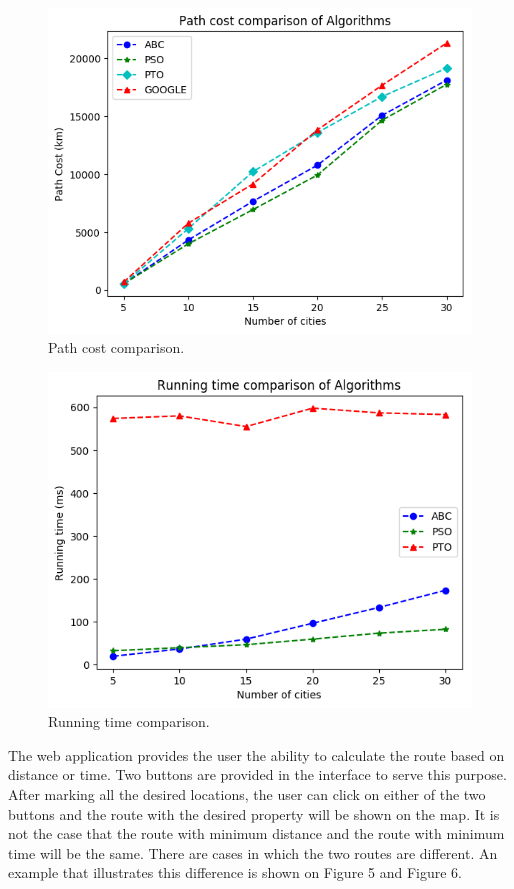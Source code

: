 \documentclass[conference]{IEEEtran}
\begin{document}
\begin{figure}[htbp]
\centerline{\includegraphics[width=\columnwidth]{pathcost.png}}
\caption{Path cost comparison.}
\label{fig1}
\end{figure}

\begin{figure}[htbp]
\centerline{\includegraphics[width=\columnwidth]{runtime.png}}
\caption{Running time comparison.}
\label{fig2}
\end{figure}

The web application provides the user the ability to calculate the route based on distance or time. Two buttons are provided in the interface to serve this purpose. After marking all the desired locations, the user can click on either of the two buttons and the route with the desired property will be shown on the map. It is not the case that the route with minimum distance and the route with minimum time will be the same. There are cases in which the two routes are different. An example that illustrates this difference is shown on Figure 5 and Figure 6.
\end{document}
